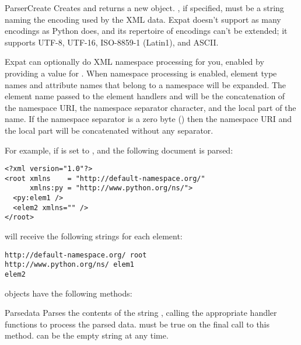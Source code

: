 \begin{funcdesc}{ParserCreate}{}
Creates and returns a new  object.  
, if specified, must be a string naming the encoding 
used by the XML data.  Expat doesn't support as many encodings as
Python does, and its repertoire of encodings can't be extended; it
supports UTF-8, UTF-16, ISO-8859-1 (Latin1), and ASCII.  

Expat can optionally do XML namespace processing for you, enabled by
providing a value for .  When namespace
processing is enabled, element type names and attribute names that
belong to a namespace will be expanded.  The element name 
passed to the element handlers 
 and 
will be the concatenation of the namespace URI, the namespace
separator character, and the local part of the name.  If the namespace
separator is a zero byte () 
then the namespace URI and the local part will be
concatenated without any separator. 

For example, if  is set to 
\samp{ }, and the following document is parsed:

\begin{verbatim}
<?xml version="1.0"?>
<root xmlns    = "http://default-namespace.org/"
      xmlns:py = "http://www.python.org/ns/">
  <py:elem1 />
  <elem2 xmlns="" />
</root>
\end{verbatim}

 will receive the following strings for each element: 

\begin{verbatim}
http://default-namespace.org/ root
http://www.python.org/ns/ elem1
elem2
\end{verbatim}

\end{funcdesc}

 objects have the following methods:

\begin{methoddesc}{Parse}{data }
Parses the contents of the string , calling the appropriate
handler functions to process the parsed data.   must be
true on the final call to this method.     can be the empty string at any time.
\end{methoddesc}

